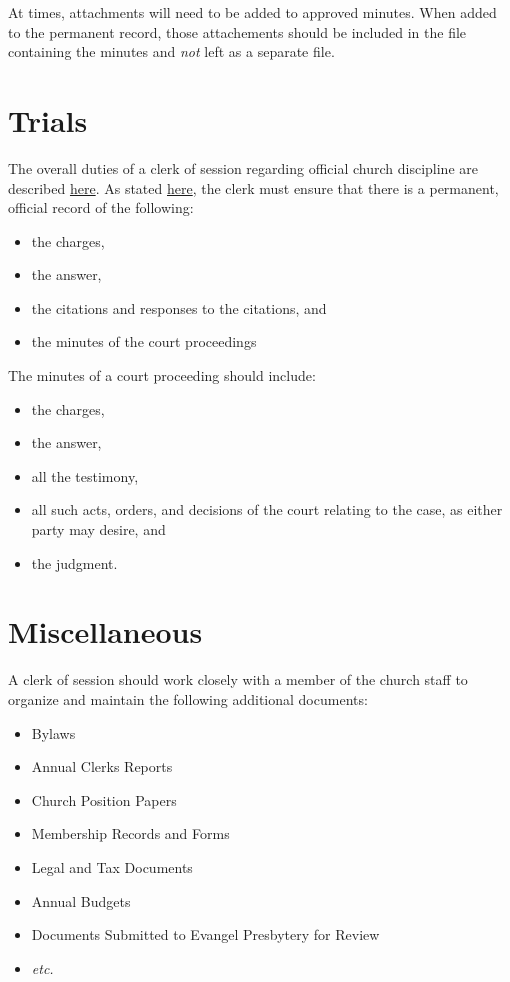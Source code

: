 \documentclass[
]{book}
\providecommand{\tightlist}{%
  \setlength{\itemsep}{0pt}\setlength{\parskip}{0pt}}
\begin{document}
At times, attachments will need to be added to approved minutes. When added to the permanent record, those attachements should be included in the file containing the minutes and \emph{not} left as a separate file.

\hypertarget{trials}{%
\section{Trials}\label{trials}}

The overall duties of a clerk of session regarding official church discipline are described \href{church-discipline.html}{here}. As stated \href{church-discipline.html\#duties-of-the-clerk}{here}, the clerk must ensure that there is a permanent, official record of the following:

\begin{itemize}
\tightlist
\item
  the charges,
\item
  the answer,
\item
  the citations and responses to the citations, and
\item
  the minutes of the court proceedings
\end{itemize}

The minutes of a court proceeding should include:

\begin{itemize}
\tightlist
\item
  the charges,
\item
  the answer,
\item
  all the testimony,
\item
  all such acts, orders, and decisions of the court relating to the case, as either party may desire, and
\item
  the judgment.
\end{itemize}

\hypertarget{miscellaneous}{%
\section{Miscellaneous}\label{miscellaneous}}

A clerk of session should work closely with a member of the church staff to organize and maintain the following additional documents:

\begin{itemize}
\tightlist
\item
  Bylaws
\item
  Annual Clerks Reports
\item
  Church Position Papers
\item
  Membership Records and Forms
\item
  Legal and Tax Documents
\item
  Annual Budgets
\item
  Documents Submitted to Evangel Presbytery for Review
\item
  \emph{etc.}
\end{itemize}
\end{document}
